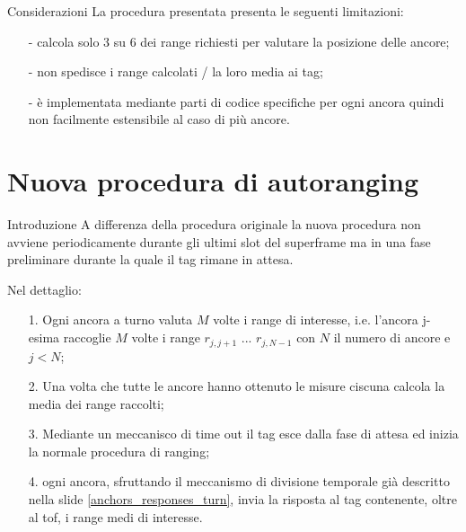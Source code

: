 \begin{frame}{Considerazioni}
  La procedura presentata presenta le seguenti limitazioni:
  \begin{itemize}
  \item [-] calcola solo 3 su 6 dei range richiesti per valutare la posizione delle ancore;
  \item [-] non spedisce i range calcolati / la loro media ai tag;
  \item [-] è implementata mediante parti di codice specifiche per ogni ancora quindi \alert{non}
    facilmente estensibile al caso di più ancore.
  \end{itemize}
\end{frame}

\section{Nuova procedura di autoranging}

\begin{frame}[shrink = 10]{Introduzione}
  A differenza della procedura originale la nuova procedura \alert{non} avviene periodicamente
  durante gli ultimi slot del superframe ma in una fase preliminare durante la quale il tag rimane in attesa.
  \par
  Nel dettaglio:
  \begin{itemize}
  \item [1.] Ogni ancora \alert{a turno} valuta $M$ volte i range di interesse, i.e. l'ancora
    j-esima raccoglie $M$ volte i range $r_{j,j+1}$ ... $r_{j,N-1}$ con $N$ il numero di ancore e $j<N$;
  \item [2.] Una volta che tutte le ancore hanno ottenuto le misure ciscuna calcola la media dei range raccolti;
  \item [3.] Mediante un meccanisco di time out il tag esce dalla fase di attesa ed inizia la normale procedura di ranging;
  \item [4.] ogni ancora, sfruttando il meccanismo di divisione temporale già descritto nella slide \ref{anchors_responses_turn},
    invia la risposta al tag contenente, oltre al tof, i range medi di interesse.
  \end{itemize}
\end{frame}

